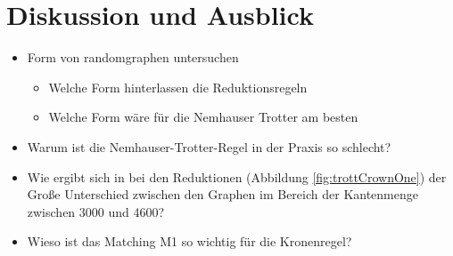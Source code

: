 
\chapter{Diskussion und Ausblick}
\label{ch:fazit}

\begin{itemize}
\item Form von randomgraphen untersuchen
	\begin{itemize}
	\item Welche Form hinterlassen die Reduktionsregeln
	\item Welche Form wäre für die Nemhauser Trotter am besten
	\end{itemize}
\item Warum ist die Nemhauser-Trotter-Regel in der Praxis so schlecht?
\item Wie ergibt sich in bei den Reduktionen (Abbildung \ref{fig:trottCrownOne}) der Große Unterschied zwischen den Graphen im Bereich der Kantenmenge zwischen 3000 und 4600?
\item Wieso ist das Matching M1 so wichtig für die Kronenregel?
\end{itemize}

